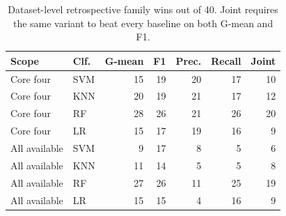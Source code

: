 \begin{table}[pos=!htbp]
\centering\small
\caption{Dataset-level retrospective family wins out of 40. Joint requires the same variant to beat every baseline on both G-mean and F1.}\label{tab:family}
\begin{tabular}{llrrrrr}\toprule
Scope & Clf. & G-mean & F1 & Prec. & Recall & Joint \\
\midrule
Core four & SVM & 15 & 19 & 20 & 17 & 10 \\
Core four & KNN & 20 & 19 & 21 & 17 & 12 \\
Core four & RF & 28 & 26 & 21 & 26 & 20 \\
Core four & LR & 15 & 17 & 19 & 16 & 9 \\
All available & SVM & 9 & 17 & 8 & 5 & 6 \\
All available & KNN & 11 & 14 & 5 & 5 & 8 \\
All available & RF & 27 & 26 & 11 & 25 & 19 \\
All available & LR & 15 & 15 & 4 & 16 & 9 \\
\bottomrule\end{tabular}
\end{table}
